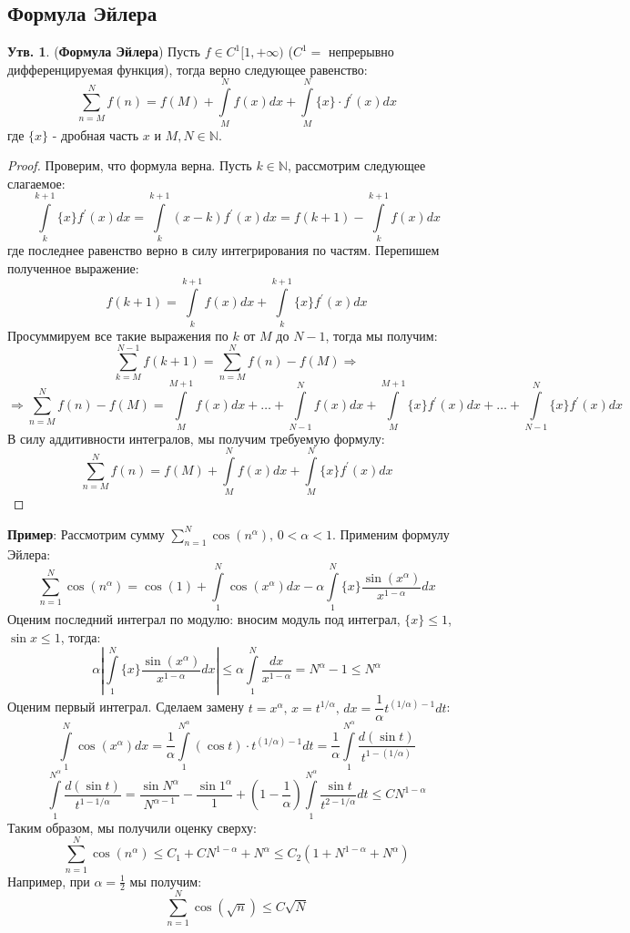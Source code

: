 \documentclass[12pt]{article}
\newcommand{\MN}{\mathbb{N}}
\theoremstyle{definition}
\newtheorem{prop}{Утв.}
\newcommand{\ddint}[2]{\displaystyle\int\limits_{#1}^{#2}}
\begin{document}
\subsection*{Формула Эйлера}
\begin{prop}(\textbf{Формула Эйлера})
	Пусть $f \in C^1[1,+\infty)$ ($C^1 = $ непрерывно дифференцируемая функция), тогда верно следующее равенство:
	$$
		\sum\limits_{n = M}^{N}f(n) = f(M) + \int\limits_{M}^{N}f(x)dx + \int\limits_{M}^{N}\{x\}{\cdot}f^\prime(x)dx
	$$
	где $\{x\}$ - дробная часть $x$ и $M,N \in \MN$.
\end{prop}
\begin{proof}
	Проверим, что формула верна. Пусть $k \in \MN$, рассмотрим следующее слагаемое:
	$$
		\int\limits_{k}^{k+1}\{x\}f^\prime(x)dx = \ddint{k}{k+1}(x-k)f^\prime(x)dx = f(k+1) - \ddint{k}{k+1}f(x)dx
	$$
	где последнее равенство верно в силу интегрирования по частям. Перепишем полученное выражение:
	$$
		f(k+1) = \ddint{k}{k+1}f(x)dx + \ddint{k}{k+1}\{x\}f^\prime(x)dx
	$$
	Просуммируем все такие выражения по $k$ от $M$ до $N-1$, тогда мы получим:
	$$
		\sum\limits_{k = M}^{N-1}f(k+1) = \sum\limits_{n = M}^{N}f(n) - f(M) \Rightarrow
	$$
	$$
		\Rightarrow \sum\limits_{n = M}^{N}f(n) - f(M) = \ddint{M}{M+1} f(x)dx + \dotsc + \ddint{N-1}{N}f(x)dx + \ddint{M}{M+1}\{x\}f^\prime(x)dx + \dotsc + \ddint{N-1}{N}\{x\}f^\prime(x)dx
	$$
	В силу аддитивности интегралов,  мы получим требуемую формулу:
	$$
		\sum\limits_{n = M}^{N}f(n) = f(M) + \ddint{M}{N}f(x)dx + \ddint{M}{N}\{x\}f^\prime(x)dx
	$$
\end{proof}

\textbf{Пример}: Рассмотрим сумму $\sum\limits_{n=1}^N \cos{(n^\alpha)}, \, 0 < \alpha < 1$. Применим формулу Эйлера:
$$
	\sum\limits_{n=1}^N \cos{(n^\alpha)} = \cos{(1)} + \ddint{1}{N}\cos{(x^\alpha)}dx - \alpha \ddint{1}{N}\{x\}\dfrac{\sin{(x^\alpha)}}{x^{1 - \alpha}}dx
$$
Оценим последний интеграл по модулю: вносим модуль под интеграл, $\{x\} \leq 1$, $\sin{x} \leq 1$, тогда:
$$
	\alpha \left| \ddint{1}{N}\{x\}\dfrac{\sin{(x^\alpha)}}{x^{1 - \alpha}}dx \right| \leq \alpha \ddint{1}{N}\dfrac{dx}{x^{1-\alpha}} = N^\alpha - 1 \leq N^\alpha
$$ 
Оценим первый интеграл. Сделаем замену $t = x^\alpha, \, x = t^{1/\alpha}, \, dx = \dfrac{1}{\alpha} t^{(1/\alpha)-1}dt$:
$$
	\ddint{1}{N}\cos{(x^\alpha)}dx = \dfrac{1}{\alpha}\ddint{1}{N^\alpha}(\cos{t}){\cdot}t^{(1/\alpha) - 1}dt = \dfrac{1}{\alpha}\ddint{1}{N^\alpha}\dfrac{d(\sin{t})}{t^{1 - (1/\alpha)}}
$$
$$
	\ddint{1}{N^\alpha}\dfrac{d(\sin{t})}{t^{1 - 1/\alpha}} = \dfrac{\sin{N^\alpha}}{N^{\alpha - 1}} - \dfrac{\sin{1^\alpha}}{1} + \left(1 - \dfrac{1}{\alpha}\right)\ddint{1}{N^\alpha}\dfrac{\sin{t}}{t^{2 - 1/\alpha}}dt \leq CN^{1- \alpha}
$$
Таким образом, мы получили оценку сверху:
$$
	\sum\limits_{n=1}^N \cos{(n^\alpha)} \leq C_1 + CN^{1 - \alpha} + N^\alpha \leq C_2\left(1 + N^{1 - \alpha} + N^\alpha\right)
$$
Например, при $\alpha = \frac{1}{2}$ мы получим:
$$
	\sum\limits_{n=1}^N \cos{(\sqrt{n})} \leq C\sqrt{N}
$$
\end{document}
